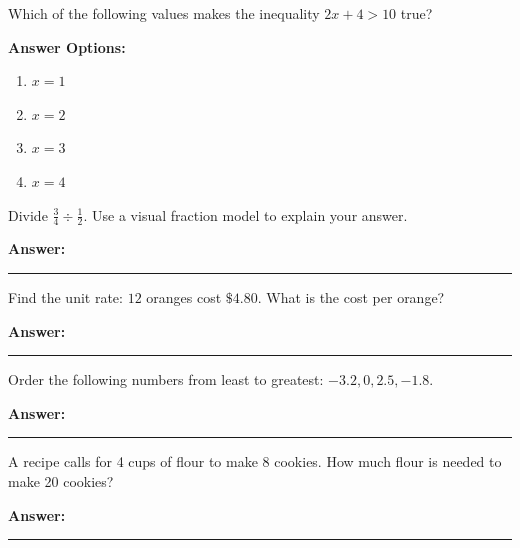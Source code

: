 \documentclass[12pt]{article}
\begin{document}
\begin{tcolorbox}[colframe=black!50, colback=white, title=\textbf{Problem 4 (6.EE.B.5)}]
Which of the following values makes the inequality \(2x + 4 > 10\) true?

\textbf{Answer Options:}
\begin{enumerate}[label=(\Alph*), itemsep=0.5cm]
    \item \(x = 1\)
    \item \(x = 2\)
    \item \(x = 3\)
    \item \(x = 4\)
\end{enumerate}
\vspace{1cm}
\end{tcolorbox}

\begin{tcolorbox}[colframe=black!50, colback=white, title=\textbf{Problem 5 (6.NS.A.1)}]
Divide \(\frac{3}{4} \div \frac{1}{2}\). Use a visual fraction model to explain your answer.

\vspace{3cm}
\textbf{Answer:} \rule{0.5\textwidth}{0.4mm}
\end{tcolorbox}

\begin{tcolorbox}[colframe=black!50, colback=white, title=\textbf{Problem 6 (6.RP.A.2)}]
Find the unit rate: \(12\) oranges cost \(\$4.80\). What is the cost per orange?

\vspace{2cm}
\textbf{Answer:} \rule{0.5\textwidth}{0.4mm}
\end{tcolorbox}

\begin{tcolorbox}[colframe=black!50, colback=white, title=\textbf{Problem 7 (6.NS.C.7)}]
Order the following numbers from least to greatest: \(-3.2, 0, 2.5, -1.8\).

\vspace{2cm}
\textbf{Answer:} \rule{0.5\textwidth}{0.4mm}
\end{tcolorbox}

\begin{tcolorbox}[colframe=black!50, colback=white, title=\textbf{Problem 8 (6.RP.A.3)}]
A recipe calls for 4 cups of flour to make 8 cookies. How much flour is needed to make 20 cookies?

\vspace{2.5cm}
\textbf{Answer:} \rule{0.5\textwidth}{0.4mm}
\end{tcolorbox}
\end{document}
